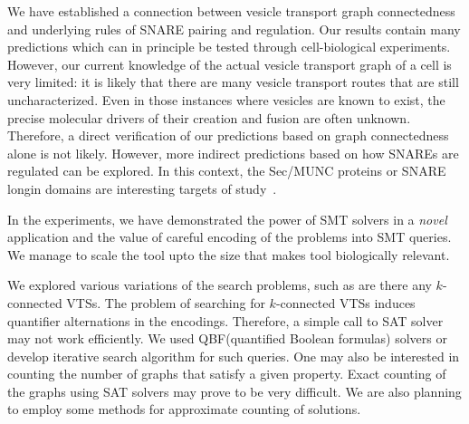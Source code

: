 \noindent 
%
We have established a connection between vesicle transport graph connectedness and underlying rules of SNARE pairing and regulation. 
%
Our results contain many predictions which can in
principle be tested through cell-biological experiments. 
%
However, our current knowledge of the actual vesicle transport graph
of a cell is very limited: it is likely that there are many vesicle
transport routes that are still uncharacterized. Even in those
instances where vesicles are known to exist, the precise molecular
drivers of their creation and fusion are often unknown.
%
Therefore, a direct verification of our predictions based on graph connectedness
alone is not likely. 
%
However, more indirect predictions based on how SNAREs are regulated can be
explored. 
%
In this context, the Sec/MUNC proteins or SNARE longin domains are interesting
targets of study~\cite{van2010one,rossi2004longins}.

In the experiments, we have demonstrated the power of SMT solvers in a {\em novel} application
and the value of careful encoding of the problems into SMT queries. 
%
We manage to scale the tool upto the size that makes tool biologically relevant.
%

%
We explored various variations of the search problems, such as
are there any $k$-connected VTSs.
%
The problem of searching for $k$-connected VTSs
induces quantifier alternations in the encodings.
%
Therefore, a simple call to SAT solver may not work efficiently. 
%
We used QBF(quantified Boolean
formulas) solvers or develop iterative search algorithm for such queries.
%
One may also be interested in counting the number of graphs that satisfy
a given property. 
%
Exact counting of the graphs using SAT solvers may prove to be very
difficult. 
%
We are also planning to employ some methods for approximate counting
of solutions.


